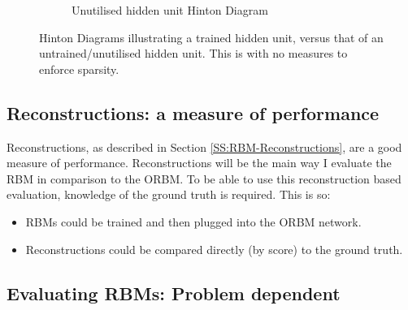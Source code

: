 \begin{figure}[htb]
\begin{subfigure}[t]{0.3\textwidth}
      \caption{Unutilised hidden unit Hinton Diagram}
      \label{F:Hinton-Bad}
  \end{subfigure}
  \caption{Hinton Diagrams illustrating a trained hidden unit, versus that of an untrained/unutilised hidden unit. This is with no measures to enforce sparsity.}\label{fig:mnist-worse-best-results}
\end{figure}

\subsection{Reconstructions: a measure of performance}

Reconstructions, as described in Section \ref{SS:RBM-Reconstructions}, are a good measure of performance. Reconstructions will be the main way I evaluate the RBM in comparison to the ORBM. To be able to use this reconstruction based evaluation, knowledge of the ground truth is required. This is so:
\begin{itemize}
  \item RBMs could be trained and then plugged into the ORBM network.
  \item Reconstructions could be compared directly (by score) to the ground truth.
\end{itemize}

\subsection{Evaluating RBMs: Problem dependent}

